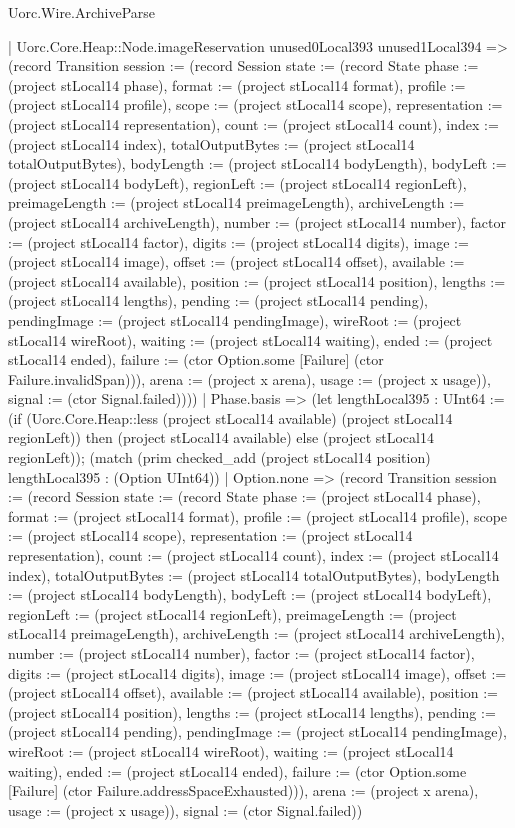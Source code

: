 \begin{lexlean}{Uorc.Wire.ArchiveParse}
\begin{semanticmodule}
{            | Uorc.Core.Heap::Node.imageReservation unused0Local393 unused1Local394 => (record Transition {session := (record Session {state := (record State {phase := (project stLocal14 phase), format := (project stLocal14 format), profile := (project stLocal14 profile), scope := (project stLocal14 scope), representation := (project stLocal14 representation), count := (project stLocal14 count), index := (project stLocal14 index), totalOutputBytes := (project stLocal14 totalOutputBytes), bodyLength := (project stLocal14 bodyLength), bodyLeft := (project stLocal14 bodyLeft), regionLeft := (project stLocal14 regionLeft), preimageLength := (project stLocal14 preimageLength), archiveLength := (project stLocal14 archiveLength), number := (project stLocal14 number), factor := (project stLocal14 factor), digits := (project stLocal14 digits), image := (project stLocal14 image), offset := (project stLocal14 offset), available := (project stLocal14 available), position := (project stLocal14 position), lengths := (project stLocal14 lengths), pending := (project stLocal14 pending), pendingImage := (project stLocal14 pendingImage), wireRoot := (project stLocal14 wireRoot), waiting := (project stLocal14 waiting), ended := (project stLocal14 ended), failure := (ctor Option.some [Failure] (ctor Failure.invalidSpan))}), arena := (project x arena), usage := (project x usage)}), signal := (ctor Signal.failed)})))
        | Phase.basis => (let lengthLocal395 : UInt64 := (if (Uorc.Core.Heap::less (project stLocal14 available) (project stLocal14 regionLeft)) then (project stLocal14 available) else (project stLocal14 regionLeft)); (match (prim checked_add (project stLocal14 position) lengthLocal395 : (Option UInt64))
          | Option.none => (record Transition {session := (record Session {state := (record State {phase := (project stLocal14 phase), format := (project stLocal14 format), profile := (project stLocal14 profile), scope := (project stLocal14 scope), representation := (project stLocal14 representation), count := (project stLocal14 count), index := (project stLocal14 index), totalOutputBytes := (project stLocal14 totalOutputBytes), bodyLength := (project stLocal14 bodyLength), bodyLeft := (project stLocal14 bodyLeft), regionLeft := (project stLocal14 regionLeft), preimageLength := (project stLocal14 preimageLength), archiveLength := (project stLocal14 archiveLength), number := (project stLocal14 number), factor := (project stLocal14 factor), digits := (project stLocal14 digits), image := (project stLocal14 image), offset := (project stLocal14 offset), available := (project stLocal14 available), position := (project stLocal14 position), lengths := (project stLocal14 lengths), pending := (project stLocal14 pending), pendingImage := (project stLocal14 pendingImage), wireRoot := (project stLocal14 wireRoot), waiting := (project stLocal14 waiting), ended := (project stLocal14 ended), failure := (ctor Option.some [Failure] (ctor Failure.addressSpaceExhausted))}), arena := (project x arena), usage := (project x usage)}), signal := (ctor Signal.failed)})
}
\end{semanticmodule}
\end{lexlean}
